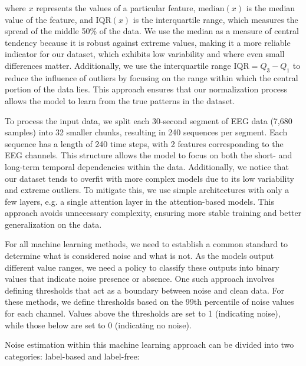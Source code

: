 where $x$ represents the values of a particular feature, $\text{median}(x)$ is the median value of the feature, and $\text{IQR}(x)$ is the interquartile range, which measures the spread of the middle 50\% of the data. We use the median as a measure of central tendency because it is robust against extreme values, making it a more reliable indicator for our dataset, which exhibits low variability and where even small differences matter. Additionally, we use the interquartile range $\text{IQR} = Q_3 - Q_1$ to reduce the influence of outliers by focusing on the range within which the central portion of the data lies. This approach ensures that our normalization process allows the model to learn from the true patterns in the dataset.

To process the input data, we split each 30-second segment of EEG data (7,680 samples) into 32 smaller chunks, resulting in 240 sequences per segment. Each sequence has a length of 240 time steps, with 2 features corresponding to the EEG channels. This structure allows the model to focus on both the short- and long-term temporal dependencies within the data. Additionally, we notice that our dataset tends to overfit with more complex models due to its low variability and extreme outliers. To mitigate this, we use simple architectures with only a few layers, e.g. a single attention layer in the attention-based models. This approach avoids unnecessary complexity, ensuring more stable training and better generalization on the data.

For all machine learning methods, we need to establish a common standard to determine what is considered noise and what is not. As the models output different value ranges, we need a policy to classify these outputs into binary values that indicate noise presence or absence. One such approach involves defining thresholds that act as a boundary between noise and clean data. For these methods, we define thresholds based on the 99th percentile of noise values for each channel. Values above the thresholds are set to 1 (indicating noise), while those below are set to 0 (indicating no noise).

Noise estimation within this machine learning approach can be divided into two categories: label-based and label-free:

